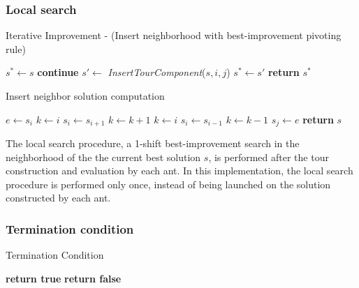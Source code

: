 \begin{homeworkProblem}
\subsubsection{Local search}
\begin{algorithm}[!h]
  \caption{Iterative Improvement - (Insert neighborhood with best-improvement pivoting rule)}\label{locsearch}
  \begin{algorithmic}[1]
      \State $s^{*} \gets s$ 
				    \State \textbf{continue}
			    \EndIf
			    \State $s' \gets$ \emph{InsertTourComponent}($s,i,j$)
          \State $s^{*} \gets s'$
        \EndIf
        \EndFor
      \EndFor
      \State \textbf{return} $s^{*}$
    \EndProcedure
\end{algorithmic}
\end{algorithm}

\begin{algorithm}[!h]
  \caption{Insert neighbor solution computation}\label{locsearch}
  \begin{algorithmic}[1]
      \State {}
      \State $e \gets s_i$
      \State $k \gets i$
				  \State $s_i \gets s_{i+1}$
				  \State $k \gets k+1$
			  \EndWhile
			\Else
			\State $k \gets i$
				  \State $s_i \gets s_{i-1}$
				  \State $k \gets k-1$
			  \EndWhile
			\EndIf
			\State $s_j \gets e$
     \State \textbf{return} $s$
    \EndProcedure
\end{algorithmic}
\end{algorithm}

The local search procedure, a 1-shift best-improvement search in the neighborhood of the the current best solution $s$,  is performed after the tour construction and evaluation by each ant.
In this implementation, the local search procedure is performed only once, instead of being launched on the solution constructed by each ant.

\subsubsection{Termination condition}
\begin{algorithm}[!h]
  \caption{Termination Condition}\label{termcond}
  \begin{algorithmic}[1]
				    \State \textbf{return true}
			    \EndIf
      \State \textbf{return false}
    \EndProcedure
\end{algorithmic}
\end{algorithm}


\end{homeworkProblem}
